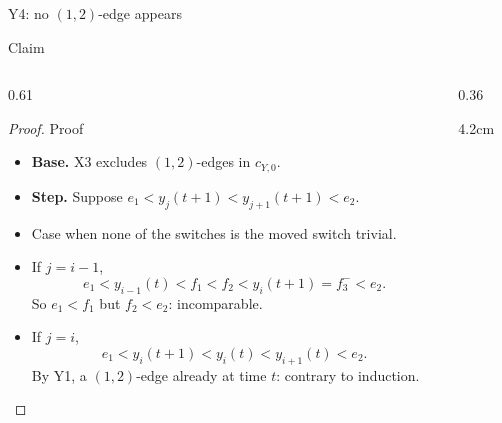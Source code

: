 \begin{frame}[t]{Y4: no $(1,2)$-edge appears}
  \footnotesize{}
  \claimreminder{\Xthree\Yone\Ymovenotation}
  \begin{lemma}{Claim}\Yfour\end{lemma}
  \begin{columns}[T,onlytextwidth]
    \begin{column}{0.61\textwidth}
      \begin{proof}{Proof}
        \begin{itemize}[itemsep=5pt]
          \item<1-> \textbf{Base.} X3 excludes $(1,2)$-edges in $c_{Y,0}$.
          \item<2-> \textbf{Step.} Suppose $e_1<y_j(t+1)<y_{j+1}(t+1)<e_2$.
          \item<3-> Case when none of the switches is the moved switch trivial.
          \item<4-> If $j=i-1$,
            \vspace{-1em}
            \[
              e_1<y_{i-1}(t)<f_1<f_2<y_i(t+1)=f_3^-<e_2.
            \]
            So $e_1<f_1$ but $f_2<e_2$: incomparable.
          \item<5-> If $j=i$,
            \vspace{-1em}
            \[
              e_1<y_i(t+1)<y_i(t)<y_{i+1}(t)<e_2.
            \]
            By Y1, a $(1,2)$-edge already at time $t$:
            contrary to induction.
        \end{itemize}
      \end{proof}
    \end{column}
    \begin{column}{0.36\textwidth}
      \centering\scriptsize{}
      \begin{overlayarea}{\linewidth}{4.2cm}
        \centering
\end{overlayarea}
\end{column}
\end{columns}
\end{frame}
